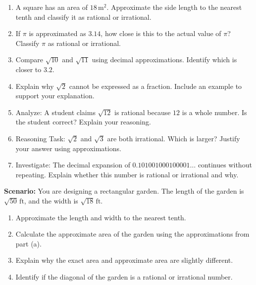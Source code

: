 \documentclass[12pt]{article}
\begin{document}
\begin{tcolorbox}[colframe=black!60, colback=white, 
coltitle=black, colbacktitle=black!15, fonttitle=\bfseries\Large, 
title=Problems, halign title=center, left=10pt, right=10pt, top=10pt, bottom=60pt]
\begin{enumerate}[start=7, itemsep=5em]
    \item A square has an area of \( 18 \, \text{m}^2 \). Approximate the side length to the nearest tenth and classify it as rational or irrational.
    \item If \( \pi \) is approximated as \( 3.14 \), how close is this to the actual value of \( \pi \)? Classify \( \pi \) as rational or irrational.
    \item Compare \( \sqrt{10} \) and \( \sqrt{11} \) using decimal approximations. Identify which is closer to \( 3.2 \).
    \item Explain why \( \sqrt{2} \) cannot be expressed as a fraction. Include an example to support your explanation.
    \item Analyze: A student claims \( \sqrt{12} \) is rational because \( 12 \) is a whole number. Is the student correct? Explain your reasoning.
    \item Reasoning Task: \( \sqrt{2} \) and \( \sqrt{3} \) are both irrational. Which is larger? Justify your answer using approximations.
    \item Investigate: The decimal expansion of \( 0.101001000100001\ldots \) continues without repeating. Explain whether this number is rational or irrational and why.
\end{enumerate}
\end{tcolorbox}

\vspace{1em}
\vspace{1em}

\begin{tcolorbox}[colframe=black!60, colback=white, 
coltitle=black, colbacktitle=black!15, fonttitle=\bfseries\Large, 
title=Performance Task: Estimating Square Roots, halign title=center, left=10pt, right=10pt, top=10pt, bottom=100pt]
\textbf{Scenario:} You are designing a rectangular garden. The length of the garden is \( \sqrt{50} \, \text{ft} \), and the width is \( \sqrt{18} \, \text{ft} \).
\begin{enumerate}[itemsep=5em]
    \item Approximate the length and width to the nearest tenth.
    \item Calculate the approximate area of the garden using the approximations from part (a).
    \item Explain why the exact area and approximate area are slightly different.
    \item Identify if the diagonal of the garden is a rational or irrational number.
\end{enumerate}
\end{tcolorbox}
\end{document}

